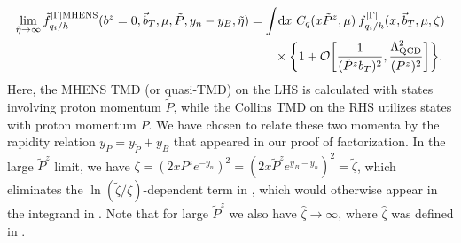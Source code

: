 \documentclass[11pt,a4paper]{article}
\newcommand{\df}{\mathrm{d}}
\newcommand{\cO}{\mathcal{O}}
\newcommand{\nn}{\nonumber}
\newcommand{\bt}{\vec b_T}
\newcommand{\q}{q_i}
\begin{document}
\begin{align} \label{eq:factorization_MHENS0}
\lim_{\tilde\eta\to \infty} \tilde f_{\q/h}^{[\Gamma]{\rm MHENS}}
  (b^z=0, \bt, \mu, \tilde P,y_n-y_B,\tilde\eta)
 &=  \int\! \df x\ C_q(x \tilde P^z, \mu)\: 
    f_{\q/h}^{[\Gamma]}(x, \bt, \mu, \zeta)
\nn\\&\qquad
 \times\bigg\{ 1 + \cO\biggl[{ 1\over (\tilde P^z b_T)^2}, { \Lambda_{\rm QCD}^2 \over (\tilde P^z)^2 } \biggr] \bigg\}
.
\end{align}
Here, the MHENS TMD (or quasi-TMD) on the LHS is calculated with states involving proton momentum $\tilde P$, while the Collins TMD on the RHS utilizes states with proton momentum $P$. We have chosen to relate these two momenta by the rapidity relation $y_P=y_{\tilde P}+y_B$ that appeared in our proof of factorization. In the large $\tilde P^z$ limit, we have $\zeta=(2 xP^z e^{-y_n})^2 = (2 x \tilde P^z e^{y_B-y_n})^2 = \tilde\zeta$, which eliminates the $\ln(\tilde\zeta/\zeta)$-dependent term in , which would otherwise appear in the integrand in . 
Note that for large $\tilde P^z$ we also have $\hat\zeta\to\infty$, where $\hat\zeta$ was defined in .
\end{document}
